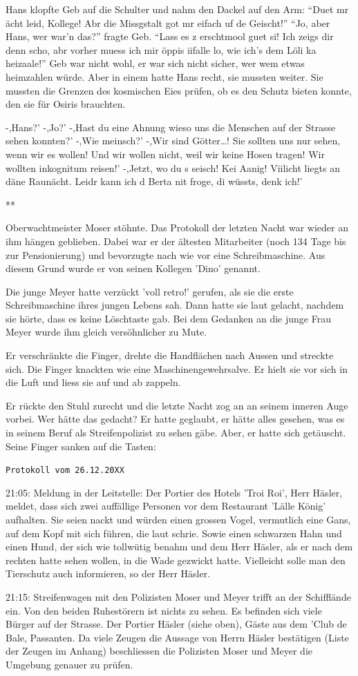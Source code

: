 \documentclass[11pt,titlepage,a5paper]{book}
\newcommand{\sterne}{\par{\centering ***\par}}
\begin{document}
Hans klopfte Geb auf die Schulter und nahm den Dackel auf den Arm: "`Duet mr ächt leid, Kollege! Abr die Missgstalt got mr eifach uf de Geischt!"' "`Jo, aber Hans, wer war'n das?"' fragte Geb. "`Lass es z erschtmool guet si! Ich zeigs dir denn scho, abr vorher muess ich mir öppis iifalle lo, wie ich's dem Löli ka heizaale!"' Geb war nicht wohl, er war sich nicht sicher, wer wem etwas heimzahlen würde. Aber in einem hatte Hans recht, sie mussten weiter. Sie mussten die Grenzen des kosmischen Eies prüfen, ob es den Schutz bieten konnte, den sie für Osiris brauchten.

-,Hans?' -,Jo?' -,Hast du eine Ahnung wieso uns die Menschen auf der Strasse sehen konnten?' -,Wie meinsch?' -,Wir sind Götter\dots! Sie sollten uns nur sehen, wenn wir es wollen! Und wir wollen nicht, weil wir keine Hosen tragen! Wir wollten inkognitum reisen!' -,Jetzt, wo du s seisch! Kei Aanig! Viilicht liegts an däne Raunächt. Leidr kann ich d Berta nit froge, di wüssts, denk ich!'

\sterne

Oberwachtmeister Moser stöhnte. Das Protokoll der letzten Nacht war wieder an ihm hängen geblieben. Dabei war er der ältesten Mitarbeiter (noch 134 Tage bis zur Pensionierung) und bevorzugte nach wie vor eine Schreibmaschine. Aus diesem Grund wurde er von seinen Kollegen 'Dino' genannt. 

Die junge Meyer hatte verzückt 'voll retro!' gerufen, als sie die erste Schreibmaschine ihres jungen Lebens sah. Dann hatte sie laut gelacht, nachdem sie hörte, dass es keine Löschtaste gab. Bei dem Gedanken an die junge Frau Meyer wurde ihm gleich versöhnlicher zu Mute. 

Er verschränkte die Finger, drehte die Handflächen nach Aussen und streckte sich. Die Finger knackten wie eine Maschinengewehrsalve. Er hielt sie vor sich in die Luft und liess sie auf und ab zappeln. 

Er rückte den Stuhl zurecht und die letzte Nacht zog an an seinem inneren Auge vorbei. Wer hätte das gedacht? Er hatte geglaubt, er hätte alles gesehen, was es in seinem Beruf als Streifenpolizist zu sehen gäbe. Aber, er hatte sich getäuscht. Seine Finger sanken auf die Tasten:

{\tt Protokoll vom 26.12.20XX
 
21:05: Meldung in der Leitstelle: Der Portier des Hotels 'Troi Roi', Herr Häsler, meldet, dass sich zwei auffällige Personen vor dem Restaurant 'Lälle König' aufhalten. Sie seien nackt und würden einen grossen Vogel, vermutlich eine Gans, auf dem Kopf mit sich führen, die laut schrie. Sowie einen schwarzen Hahn und einen Hund, der sich wie tollwütig benahm und dem Herr Häsler, als er nach dem rechten hatte sehen wollen, in die Wade gezwickt hatte. Vielleicht solle man den Tierschutz auch informieren, so der Herr Häsler.

21:15: Streifenwagen mit den Polizisten Moser und Meyer trifft an der Schifflände ein. Von den beiden Ruhestörern ist nichts zu sehen. Es befinden sich viele Bürger auf der Strasse. Der Portier Häsler (siehe oben), Gäste aus dem 'Club de Bale, Passanten. Da viele Zeugen die Aussage von Herrn Häsler bestätigen (Liste der Zeugen im Anhang) beschliessen die Polizisten Moser und Meyer die Umgebung genauer zu prüfen.}
\end{document}
